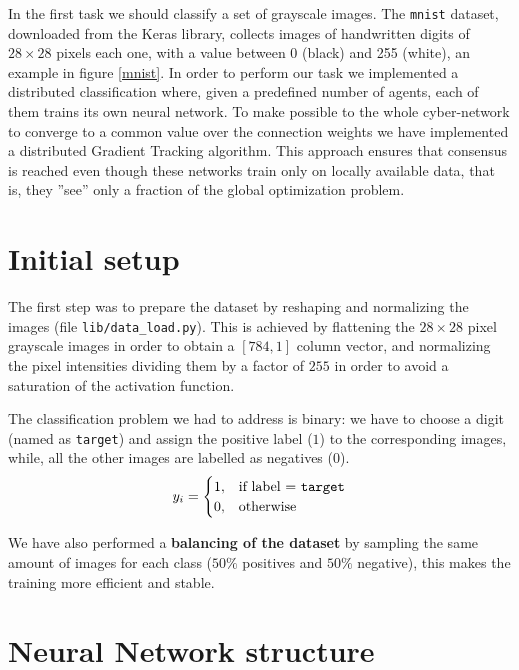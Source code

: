 \documentclass[a4paper,11pt,oneside]{book}
\begin{document}
In the first task we should classify a set of grayscale images. The \texttt{mnist} dataset, downloaded from the Keras library, collects images of handwritten digits of $28\times28$ pixels each one, with a value between 0 (black) and 255 (white), an example in figure \ref{mnist}. In order to perform our task we implemented a distributed classification where, given a predefined number of agents, each of them trains its own neural network. To make possible to the whole cyber-network to converge to a common value over the connection weights we have implemented a distributed Gradient Tracking algorithm. This approach ensures that consensus is reached even though these networks train only on locally available data, that is, they ''see'' only a fraction of the global optimization problem.

\section{Initial setup}
The first step was to prepare the dataset by reshaping and normalizing the images (file \texttt{lib/data\_load.py}). This is achieved by flattening the $28\times28$ pixel grayscale images in order to obtain a $[784,1]$ column vector, and normalizing the pixel intensities dividing them by a factor of $255$ in order to avoid a saturation of the activation function.

\bigskip
The classification problem we had to address is binary: we have to choose a digit (named as \texttt{target}) and assign the positive label ($1$) to the corresponding images, while, all the other images are labelled as negatives ($0$).
\begin{equation}
y_i = 
\begin{cases}
1, & \text{if label = \texttt{target}} \\
0, & \text{otherwise}
\end{cases}
\end{equation}

We have also performed a \textbf{balancing of the dataset} by sampling the same amount of images for each class ($50\%$ positives and $50\%$ negative), this makes the training more efficient and stable.

\section{Neural Network structure}
\end{document}
